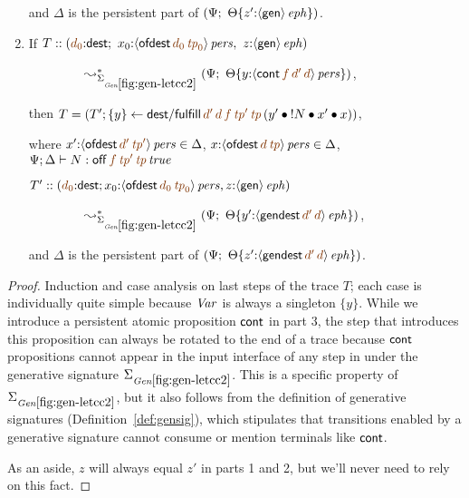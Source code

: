 \begin{lemma}
\begin{enumerate}
    and $\Delta$ is the persistent part of 
    $\left(\Psi; ~ {\Theta}\{{z'{:}{\langle {{\sf gen}} \rangle}\,{{\it eph}}}\}\right)$.


\medskip
\item If $T :: \left(\lf{d_0}{:}{\sf dest}; ~ x_0{:}\ispers{\susp{{\sf
          ofdest}\,\lf{d_0}\,\lf{{\it tp}_0}}},  ~ z{:}\iseph{\susp{{\sf
          gen}}}\right)$

   $~\qquad \qquad \leadsto^*_{\siggenletcc} \left(\Psi; ~
    \tackon{\Theta}{y{:}\ispers{\susp{{\sf
            cont}\,\lf{f}\,\lf{d'}\,\lf{d}}}}\right)$,
\smallskip

    then $T = (T'; \trstep{y}{{\sf dest/fulfill}\,\lf{d'}\,\lf{d}\,\lf{f}\,\lf{{\it tp}'}\,\lf{{\it tp}}\,
      (\tfuser{y'}{\tfuser{\tbangr{N}}{\tfuser{x'}{x}}})})$,

    where $x'{:}\ispers{\susp{{\sf ofdest}\,\lf{d'}\,\lf{{\it tp}'}}} 
           \in \Delta$,
    $x{:}\ispers{\susp{{\sf ofdest}\,\lf{d}\,\lf{{\it tp}}}} \in \Delta$,
    $\Psi; \Delta \vdash N : 
       \isconc{{\sf off}\,\lf{f}\,\lf{{\it tp}'}\,\lf{{\it tp}}}$

    $T' :: \left(\lf{d_0}{:}{\sf dest}; x_0{:}\ispers{\susp{{\sf
          ofdest}\,\lf{d_0}\,\lf{{\it tp}_0}}}, z{:}\iseph{\susp{{\sf
          gen}}}\right)$

   $~\qquad \qquad \leadsto^*_{\siggenletcc} \left(\Psi; ~
          \tackon{\Theta}
            {y'{:}\iseph{\susp{{\sf gendest}\,\lf{d'}\,\lf{d}}}}\right)$,

    and $\Delta$ is the persistent part of 
    $\left(\Psi; ~ \tackon{\Theta}
      {z'{:}\iseph{\susp{{\sf gendest}\,\lf{d'}\,\lf{d}}}}\right)$.
\smallskip
 
\end{enumerate}
\end{lemma}

\begin{proof}
  Induction and case analysis on last steps of the trace $T$; each
  case is individually quite simple because ${\it Var}$ is always a
  singleton $\{ y \}$.  While we introduce a persistent atomic
  proposition ${\sf cont}$ in part 3, the step that introduces this
  proposition can always be rotated to the end of a trace because
  ${\sf cont}$ propositions cannot appear in the input interface of
  any step in under the generative signature $\siggenletcc$. This is a
  specific property of $\siggenletcc$, but it also follows from the
  definition of generative signatures (Definition~\ref{def:gensig}),
  which stipulates that transitions enabled by a generative signature
  cannot consume or mention terminals like ${\sf cont}$.

  As an aside, $z$ will always equal $z'$ in parts 1 and 2, but we'll
  never need to rely on this fact.
\end{proof}


